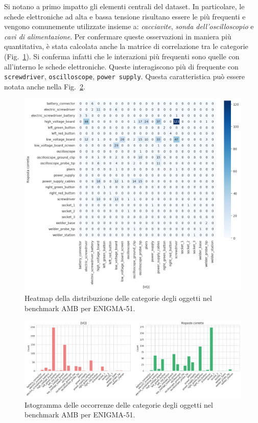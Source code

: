 Si notano a primo impatto gli elementi centrali del dataset. In particolare, le schede elettroniche ad alta e bassa tensione risultano essere le più frequenti e vengono comunemente utilizzate insieme a:
\emph{cacciavite}, \emph{sonda dell'oscilloscopio} e \emph{cavi di alimentazione}.
Per confermare queste osservazioni in maniera più quantitativa, è stata calcolata anche la matrice di correlazione tra le categorie (Fig.~\ref{fig:amb_heatmap}).
Si conferma infatti che le interazioni più frequenti sono quelle con all'interno le schede elettroniche. Queste interagiscono più di frequente con \texttt{screwdriver}, \texttt{oscilloscope}, \texttt{power supply}. Questa caratteristica può essere notata anche nella Fig.~\ref{fig:amb_hist}.

\begin{figure}[ht]
    \centering
    \includegraphics[width=1\linewidth]{Images/enigma_heat.png}
    \caption{Heatmap della distribuzione delle categorie degli oggetti nel benchmark AMB per ENIGMA-51.}
    \label{fig:amb_heatmap}
\end{figure}


\begin{figure}[ht]
    \centering
    \includegraphics[width=1\linewidth]{Images/enigma_hist.png}
    \caption{Istogramma delle occorrenze delle categorie degli oggetti nel benchmark AMB per ENIGMA-51.}
    \label{fig:amb_hist}
\end{figure}